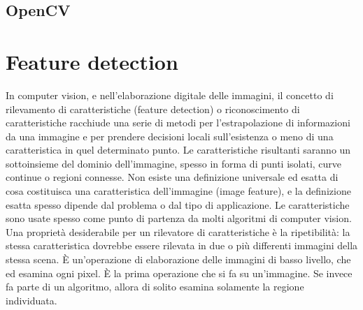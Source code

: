 \documentclass[twoside]{supsistudent}
\begin{document}
\subsection{OpenCV}

\section{Feature detection}
In computer vision, e nell'elaborazione digitale delle immagini, il concetto di rilevamento
di caratteristiche (feature detection) o riconoscimento di caratteristiche racchiude una 
serie di metodi per l'estrapolazione di informazioni da una immagine e per prendere 
decisioni locali sull'esistenza o meno di una caratteristica in quel determinato punto. 
Le caratteristiche risultanti saranno un sottoinsieme del dominio dell'immagine, spesso 
in forma di punti isolati, curve continue o regioni connesse.
Non esiste una definizione universale ed esatta di cosa costituisca una caratteristica 
dell'immagine (image feature), e la definizione esatta spesso dipende dal problema o dal 
tipo di applicazione. Le caratteristiche sono usate spesso come punto di partenza da molti 
algoritmi di computer vision.
Una proprietà desiderabile per un rilevatore di caratteristiche è la ripetibilità: 
la stessa caratteristica dovrebbe essere rilevata in due o più differenti immagini della stessa scena.
È un'operazione di elaborazione delle immagini di basso livello, che ed esamina ogni pixel. 
È la prima operazione che si fa su un'immagine. Se invece fa parte di un algoritmo, 
allora di solito esamina solamente la regione individuata.
\end{document}
